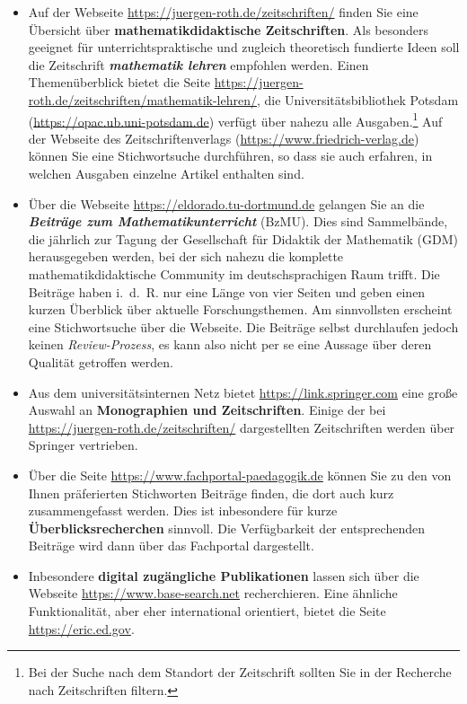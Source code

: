 \documentclass[
]{scrbook}
\theoremstyle{definition}
\theoremstyle{definition}
\theoremstyle{definition}
\theoremstyle{definition}
\theoremstyle{remark}
\begin{document}
\begin{itemize}
\item
  Auf der Webseite \url{https://juergen-roth.de/zeitschriften/} finden Sie eine Übersicht über \textbf{mathematikdidaktische Zeitschriften}. Als besonders geeignet für unterrichtspraktische und zugleich theoretisch fundierte Ideen soll die Zeitschrift \textbf{\emph{mathematik lehren}} empfohlen werden. Einen Themenüberblick bietet die Seite \url{https://juergen-roth.de/zeitschriften/mathematik-lehren/}, die Universitätsbibliothek Potsdam (\url{https://opac.ub.uni-potsdam.de}) verfügt über nahezu alle Ausgaben.\footnote{Bei der Suche nach dem Standort der Zeitschrift sollten Sie in der Recherche nach Zeitschriften filtern.} Auf der Webseite des Zeitschriftenverlags (\url{https://www.friedrich-verlag.de}) können Sie eine Stichwortsuche durchführen, so dass sie auch erfahren, in welchen Ausgaben einzelne Artikel enthalten sind.
\item
  Über die Webseite \url{https://eldorado.tu-dortmund.de} gelangen Sie an die \textbf{\emph{Beiträge zum Mathematikunterricht}} (BzMU). Dies sind Sammelbände, die jährlich zur Tagung der Gesellschaft für Didaktik der Mathematik (GDM) herausgegeben werden, bei der sich nahezu die komplette mathematikdidaktische Community im deutschsprachigen Raum trifft. Die Beiträge haben i.~d.~R. nur eine Länge von vier Seiten und geben einen kurzen Überblick über aktuelle Forschungsthemen. Am sinnvollsten erscheint eine Stichwortsuche über die Webseite. Die Beiträge selbst durchlaufen jedoch keinen \emph{Review-Prozess}, es kann also nicht per se eine Aussage über deren Qualität getroffen werden.
\item
  Aus dem universitätsinternen Netz bietet \url{https://link.springer.com} eine große Auswahl an \textbf{Monographien und Zeitschriften}. Einige der bei \url{https://juergen-roth.de/zeitschriften/} dargestellten Zeitschriften werden über Springer vertrieben.
\item
  Über die Seite \url{https://www.fachportal-paedagogik.de} können Sie zu den von Ihnen präferierten Stichworten Beiträge finden, die dort auch kurz zusammengefasst werden. Dies ist inbesondere für kurze \textbf{Überblicksrecherchen} sinnvoll. Die Verfügbarkeit der entsprechenden Beiträge wird dann über das Fachportal dargestellt.
\item
  Inbesondere \textbf{digital zugängliche Publikationen} lassen sich über die Webseite \url{https://www.base-search.net} recherchieren. Eine ähnliche Funktionalität, aber eher international orientiert, bietet die Seite \url{https://eric.ed.gov}.
\end{itemize}
\end{document}
